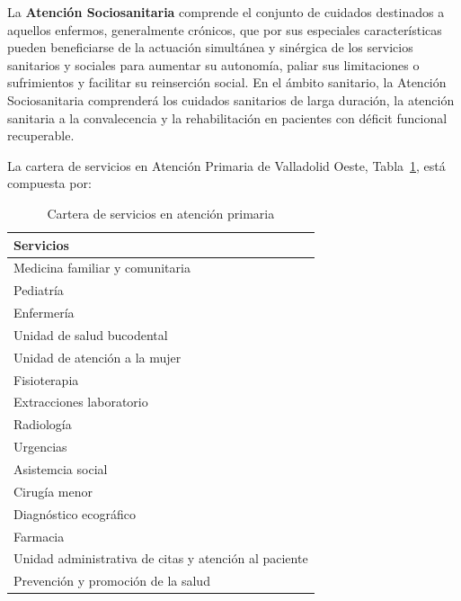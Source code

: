 La \textbf{Atención Sociosanitaria} comprende el conjunto de cuidados destinados a aquellos enfermos, generalmente crónicos, que por sus especiales características pueden beneficiarse de la actuación simultánea y sinérgica de los servicios sanitarios y sociales para aumentar su autonomía, paliar sus limitaciones o sufrimientos y facilitar su reinserción social.
En el ámbito sanitario, la Atención Sociosanitaria comprenderá los cuidados sanitarios de larga duración, la atención sanitaria a la convalecencia y la rehabilitación en pacientes con déficit funcional recuperable.

La cartera de servicios en Atención Primaria de Valladolid Oeste, Tabla~\ref{tab:cartera-servicios}, está compuesta por:

\begin{table}[H]
    \centering
    \begin{tabular}{l}
        \toprule
        Servicios                                             \\
        \midrule
        Medicina familiar y comunitaria                       \\
        Pediatría                                             \\
        Enfermería                                            \\
        Unidad de salud bucodental                            \\
        Unidad de atención a la mujer                         \\
        Fisioterapia                                          \\
        Extracciones laboratorio                              \\
        Radiología                                            \\
        Urgencias                                             \\
        Asistemcia social                                     \\
        Cirugía menor                                         \\
        Diagnóstico ecográfico                                \\
        Farmacia                                              \\
        Unidad administrativa de citas y atención al paciente \\
        Prevención y promoción de la salud                    \\
        \bottomrule
    \end{tabular}
    \caption{Cartera de servicios en atención primaria}
    \label{tab:cartera-servicios}
\end{table}

